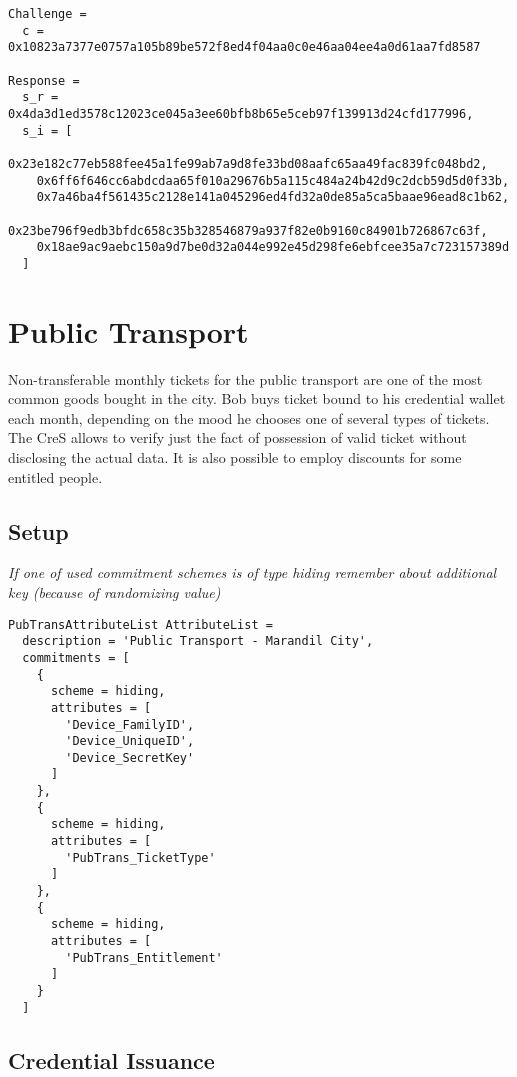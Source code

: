 \begin{verbatim}
Challenge =
  c = 0x10823a7377e0757a105b89be572f8ed4f04aa0c0e46aa04ee4a0d61aa7fd8587

Response =
  s_r = 0x4da3d1ed3578c12023ce045a3ee60bfb8b65e5ceb97f139913d24cfd177996,
  s_i = [
    0x23e182c77eb588fee45a1fe99ab7a9d8fe33bd08aafc65aa49fac839fc048bd2,
    0x6ff6f646cc6abdcdaa65f010a29676b5a115c484a24b42d9c2dcb59d5d0f33b,
    0x7a46ba4f561435c2128e141a045296ed4fd32a0de85a5ca5baae96ead8c1b62,
    0x23be796f9edb3bfdc658c35b328546879a937f82e0b9160c84901b726867c63f,
    0x18ae9ac9aebc150a9d7be0d32a044e992e45d298fe6ebfcee35a7c723157389d
  ]
\end{verbatim}
\normalsize


\section{Public Transport}
Non-transferable monthly tickets for the public transport are one of the most common goods bought in the city. Bob buys ticket bound to his credential wallet each month, depending on the mood he chooses one of several types of tickets. The CreS allows to verify just the fact of possession of valid ticket without disclosing the actual data. It is also possible to employ discounts for some entitled people.

\subsection{Setup}
\emph{If one of used commitment schemes is of type \textsf{hiding} remember about additional key (because of randomizing value)}

\small
\begin{verbatim}
PubTransAttributeList AttributeList =
  description = 'Public Transport - Marandil City',
  commitments = [
    {
      scheme = hiding,
      attributes = [
        'Device_FamilyID',
        'Device_UniqueID',
        'Device_SecretKey'
      ]
    },
    {
      scheme = hiding,
      attributes = [
        'PubTrans_TicketType'
      ]
    },
    {
      scheme = hiding,
      attributes = [
        'PubTrans_Entitlement'
      ]
    }
  ]
\end{verbatim}
\normalsize

\subsection{Credential Issuance}

